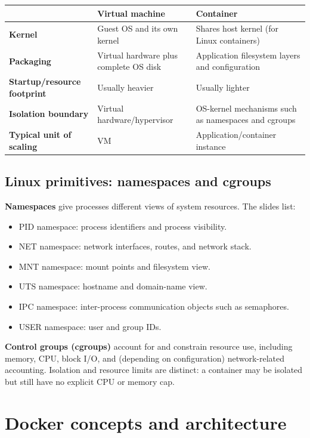 \documentclass[11pt,a4paper]{article}
\newcommand{\term}[1]{\textbf{#1}}
\begin{document}
\begin{center}\begin{tabularx}{\linewidth}{>{\bfseries}p{.18\linewidth}XX}\toprule & Virtual machine & Container \\ \midrule
Kernel & Guest OS and its own kernel & Shares host kernel (for Linux containers)\\
Packaging & Virtual hardware plus complete OS disk & Application filesystem layers and configuration\\
Startup/resource footprint & Usually heavier & Usually lighter\\
Isolation boundary & Virtual hardware/hypervisor & OS-kernel mechanisms such as namespaces and cgroups\\
Typical unit of scaling & VM & Application/container instance\\\bottomrule\end{tabularx}\end{center}

\subsection{Linux primitives: namespaces and cgroups}
\term{Namespaces} give processes different views of system resources. The slides list:
\begin{itemize}
\item PID namespace: process identifiers and process visibility.
\item NET namespace: network interfaces, routes, and network stack.
\item MNT namespace: mount points and filesystem view.
\item UTS namespace: hostname and domain-name view.
\item IPC namespace: inter-process communication objects such as semaphores.
\item USER namespace: user and group IDs.
\end{itemize}
\term{Control groups (cgroups)} account for and constrain resource use, including memory, CPU, block I/O, and (depending on configuration) network-related accounting. Isolation and resource limits are distinct: a container may be isolated but still have no explicit CPU or memory cap.

\section{Docker concepts and architecture}
\end{document}
